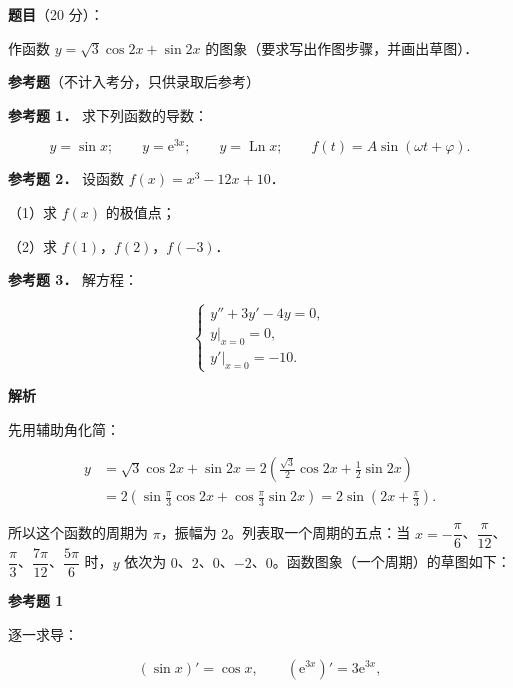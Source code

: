 \begin{answer}

\textbf{题目}（20 分）：

作函数 $y=\sqrt3\cos 2x+\sin 2x$ 的图象（要求写出作图步骤，并画出草图）．

\begin{gktip}
\textbf{参考题}（不计入考分，只供录取后参考）
\end{gktip}

\textbf{参考题 1．} 求下列函数的导数：

\nopagebreak[4]
\[
y=\sin x;\qquad y=\mathrm e^{3x};\qquad y=\operatorname{Ln}x;\qquad f(t)=A\sin(\omega t+\varphi).
\]

\textbf{参考题 2．} 设函数 $f(x)=x^3-12x+10$．

（1）求 $f(x)$ 的极值点；

（2）求 $f(1)$，$f(2)$，$f(-3)$．

\textbf{参考题 3．} 解方程：

\nopagebreak[4]
\[
\begin{cases}
y''+3y'-4y=0,\\
y\big|_{x=0}=0,\\
y'\big|_{x=0}=-10.
\end{cases}
\]

\textbf{解析}

先用辅助角化简：

\nopagebreak[4]
\[
\begin{aligned}
y&=\sqrt3\cos 2x+\sin 2x
=2\left(\frac{\sqrt3}{2}\cos 2x+\frac12\sin 2x\right)\\
&=2\left(\sin\frac{\pi}{3}\cos 2x+\cos\frac{\pi}{3}\sin 2x\right)
=2\sin\left(2x+\frac{\pi}{3}\right).
\end{aligned}
\]

所以这个函数的周期为 $\pi$，振幅为 $2$。列表取一个周期的五点：当 $x=-\dfrac{\pi}{6}$、$\dfrac{\pi}{12}$、$\dfrac{\pi}{3}$、$\dfrac{7\pi}{12}$、$\dfrac{5\pi}{6}$ 时，$y$ 依次为 $0$、$2$、$0$、$-2$、$0$。函数图象（一个周期）的草图如下：
\nopagebreak[4]
\begin{center}\end{center}
\nopagebreak[4]
\textbf{参考题 1}

逐一求导：

\nopagebreak[4]
\[
(\sin x)'=\cos x,
\qquad
\left(\mathrm e^{3x}\right)'=3\mathrm e^{3x},
\]


\end{answer}
